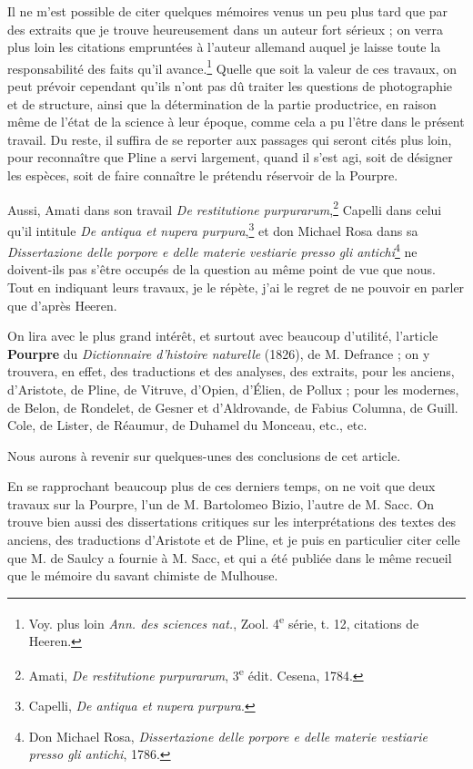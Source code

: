 \documentclass[a4paper, 11pt, oneside, polutonikogreek, french]{article}
\begin{document}
Il ne m'est possible de citer quelques mémoires venus un peu plus tard que par des extraits que je trouve heureusement dans un auteur fort sérieux ; on verra plus loin les citations empruntées à l'auteur allemand auquel je laisse toute la responsabilité des faits qu'il avance.\footnote{Voy. plus loin \emph{Ann. des sciences nat.}, Zool. 4\textsuperscript{e} série, t. 12, citations de Heeren.} Quelle que soit la valeur de ces travaux, on peut prévoir cependant qu'ils n'ont pas dû traiter les questions de photographie et de structure, ainsi que la détermination de la partie productrice, en raison même de l'état de la science à leur époque, comme cela a pu l'être dans le présent travail. Du reste, il suffira de se reporter aux passages qui seront cités plus loin, pour reconnaître que Pline a servi largement, quand il s'est agi, soit de désigner les espèces, soit de faire connaître le prétendu réservoir de la Pourpre.

Aussi, Amati dans son travail \emph{De restitutione purpurarum},\footnote{Amati, \emph{De restitutione purpurarum}, 3\textsuperscript{e} édit. Cesena, 1784.} Capelli dans celui qu'il intitule \emph{De antiqua et nupera purpura},\footnote{Capelli, \emph{De antiqua et nupera purpura}.} et don Michael Rosa dans sa \emph{Dissertazione delle porpore e delle materie vestiarie presso gli antichi}\footnote{Don Michael Rosa, \emph{Dissertazione delle porpore e delle materie vestiarie presso gli antichi}, 1786.} ne doivent-ils pas s'être occupés de la question au même point de vue que nous. Tout en indiquant leurs travaux, je le répète, j'ai le regret de ne pouvoir en parler que d'après Heeren.

On lira avec le plus grand intérêt, et surtout avec beaucoup d'utilité, l'article \textbf{Pourpre} du \emph{Dictionnaire d'histoire naturelle} (1826), de M. Defrance ; on y trouvera, en effet, des traductions et des analyses, des extraits, pour les anciens, d'Aristote, de Pline, de Vitruve, d'Opien, d'Élien, de Pollux ; pour les modernes, de Belon, de Rondelet, de Gesner et d'Aldrovande, de Fabius Columna, de Guill. Cole, de Lister, de Réaumur, de Duhamel du Monceau, etc., etc.

Nous aurons à revenir sur quelques-unes des conclusions de cet article.

En se rapprochant beaucoup plus de ces derniers temps, on ne voit que deux travaux sur la Pourpre, l'un de M. Bartolomeo Bizio, l'autre de M. Sacc. On trouve bien aussi des dissertations critiques sur les interprétations des textes des anciens, des traductions d'Aristote et de Pline, et je puis en particulier citer celle que M. de Saulcy a fournie à M. Sacc, et qui a été publiée dans le même recueil que le mémoire du savant chimiste de Mulhouse.
\end{document}
